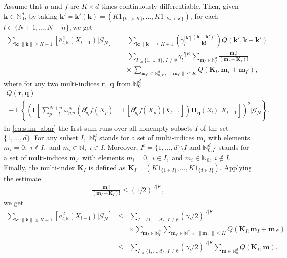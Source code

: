\documentclass[preprint]{imsart}
\begin{document}
Assume that $\mu$ and $f$ are $K\times d$ times continuously differentiable.
Then, given $\mathbf k\in\mathbb N_0^d$,
by taking $\mathbf k'= \mathbf k'(\mathbf k)
=(K1_{\{k_1>K\}},\ldots,K1_{\{k_d>K\}})$,
for each $l\in\{N+1,\ldots,N+n\}$, we get
\begin{align}
\label{eq:sum_abar}
\sum_{\mathbf{k}\colon\|\mathbf{k}\|\geq K+1}\left[\bar{a}_{l,\mathbf{k}}^{2}(X_{l-1})|\mathcal{G}_{N}\right] & =\sum_{\mathbf{k}\colon\|\mathbf{k}\|\geq K+1}\left(\gamma_{l}^{|\mathbf{k}'|}\frac{(\mathbf{k}-\mathbf{k}')!}{\mathbf{k}!}\right)Q(\mathbf{k}',\mathbf{k}-\mathbf{k}')\\
\nonumber
 & =\sum_{I\subseteq\{1,\ldots,d\},\, I\neq \emptyset}\gamma_{l}^{|I|K}\sum_{\mathbf{m}_{I}\in\mathbb{N}_{I}^{d}}\frac{\mathbf{m}_{I}!}{\left(\mathbf{m}_{I}+\mathbf{K}_{I}\right)!}
 \\
 \nonumber
 & \hspace{1em}\times\sum_{\mathbf{m}_{I^c}\in \mathbb{N}^d_{0,I^c},\,\|\mathbf{m}_{I^c}\|\leq K}Q(\mathbf{\mathbf{K}}_{I},\mathbf{m}_{I}+\mathbf{m}_{I^c}),
\end{align}
where for any two multi-indices \(\mathbf{r},\) \(\mathbf{q}\) from \(\mathbb{N}_0^d\)
\begin{multline*}
Q(\mathbf{r},\mathbf{q})
\\
=\mathsf{E}\left\{
\left(\mathsf{E}\left[\sum_{p=l}^{N+n}\omega_{p,n}^{N}\left(\partial_{y_{l}}^{\mathbf r}f\left(X_{p}\right)-\mathsf{E}\left[\partial_{y_{l}}^{\mathbf r}f\left(X_{p}\right)|X_{l-1}\right]\right)\mathbf{H}_{\mathbf{q}}(Z_{l})\Big|X_{l-1}\right]\right)^{2}
\Bigg|\mathcal G_N \right\}.
\end{multline*}
In \eqref{eq:sum_abar} the first sum runs over all nonempty subsets $I$ of the set $\{1,\ldots,d\}.$
For any subset $I,$ $\mathbb{N}_{I}^{d}$ stands for a set
of multi-indices $\mathbf{m}_{I}$ with elements $m_{i}=0,$ $i\not\in I,$
and $m_{i}\in\mathbb{N},$  $i\in I.$ Moreover, \(I^c=\{1,\ldots,d\}\setminus I\) and \(\mathbb{N}^d_{0,I^c}\) stands for a set
of multi-indices $\mathbf{m}_{I^c}$ with elements $m_{i}=0,$ $i\in I,$
and $m_{i}\in\mathbb{N}_0,$  $i\not\in I.$ Finally, the multi-index \(\mathbf{K}_I\) is defined as $\mathbf{\mathbf{K}}_{I}=(K1_{\{1\in I\}},\ldots,K1_{\{d\in I\}}).$
Applying the estimate
\begin{eqnarray*}
\frac{\mathbf{m}_{I}!}{\left(\mathbf{m}_{I}+\mathbf{K}_{I}\right)!}\leq (1/2)^{|I| K},
\end{eqnarray*}
we get
\begin{eqnarray*}
\sum_{\mathbf{k}\colon\|\mathbf{k}\|\geq K+1}\left[\bar{a}_{l,\mathbf{k}}^{2}(X_{l-1})|\mathcal{G}_{N}\right]&\leq &
\sum_{I\subseteq\{1,\ldots,d\},\, I\neq \emptyset} (\gamma_{l}/2)^{|I|K}
\\
&& \times\sum_{\mathbf{m}_{I}\in\mathbb{N}_{I}^{d}} \sum_{\mathbf{m}_{I^c}\in \mathbb{N}^d_{0,I^c},\,\|\mathbf{m}_{I^c}\|\leq K} Q(\mathbf{\mathbf{K}}_{I},\mathbf{m}_{I}+\mathbf{m}_{I^c})
\\
&\leq &
\sum_{I\subseteq\{1,\ldots,d\},\, I\neq \emptyset} (\gamma_{l}/2)^{|I|K} \sum_{\mathbf{m}\in\mathbb{N}_0^{d}} Q(\mathbf{\mathbf{K}}_{I},\mathbf{m}).
\end{eqnarray*}
\end{document}
